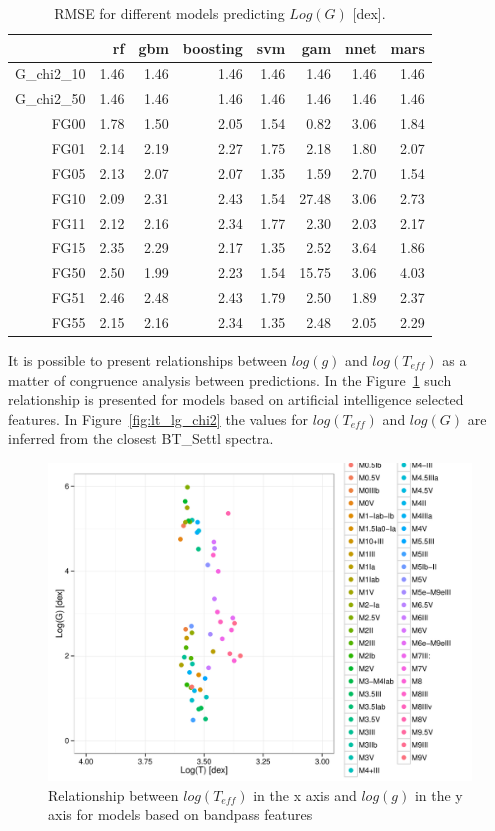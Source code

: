 \begin{table}[ht]
\centering
\begin{tabular}{rrrrrrrr}
  \hline
 & rf & gbm & boosting & svm & gam & nnet & mars \\ 
  \hline
G\_chi2\_10 & 1.46 & 1.46 & 1.46 & 1.46 & 1.46 & 1.46 & 1.46 \\ 
  G\_chi2\_50 & 1.46 & 1.46 & 1.46 & 1.46 & 1.46 & 1.46 & 1.46 \\ 
  FG00 & 1.78 & 1.50 & 2.05 & 1.54 & 0.82 & 3.06 & 1.84 \\ 
  FG01 & 2.14 & 2.19 & 2.27 & 1.75 & 2.18 & 1.80 & 2.07 \\ 
  FG05 & 2.13 & 2.07 & 2.07 & 1.35 & 1.59 & 2.70 & 1.54 \\ 
  FG10 & 2.09 & 2.31 & 2.43 & 1.54 & 27.48 & 3.06 & 2.73 \\ 
  FG11 & 2.12 & 2.16 & 2.34 & 1.77 & 2.30 & 2.03 & 2.17 \\ 
  FG15 & 2.35 & 2.29 & 2.17 & 1.35 & 2.52 & 3.64 & 1.86 \\ 
  FG50 & 2.50 & 1.99 & 2.23 & 1.54 & 15.75 & 3.06 & 4.03 \\ 
  FG51 & 2.46 & 2.48 & 2.43 & 1.79 & 2.50 & 1.89 & 2.37 \\ 
  FG55 & 2.15 & 2.16 & 2.34 & 1.35 & 2.48 & 2.05 & 2.29 \\ 
   \hline
\end{tabular}
\caption { RMSE for different models predicting $Log(G)$ [dex].} 
\label{tab:models_G_mae} 
\end{table}



It is possible to present relationships between $log(g)$ and $log(T_{eff})$
as a matter of congruence analysis between predictions. In the Figure~\ref{fig:lt_lg_ga}
such relationship is presented for models based on artificial intelligence selected features.
In Figure~\ref{fig:lt_lg_chi2} the values for $log(T_{eff})$ and $log(G)$ are 
inferred from the closest BT\_Settl spectra.

\begin{figure}
 \begin{center}
 \includegraphics[width=12cm]{figs/LT_LG_ga.pdf}
 \caption{Relationship between $log(T_{eff}) $ in the x axis 
 and $log(g)$ in the y axis for models based on bandpass features }
 \label{fig:lt_lg_ga}
 \end{center}
\end{figure}

